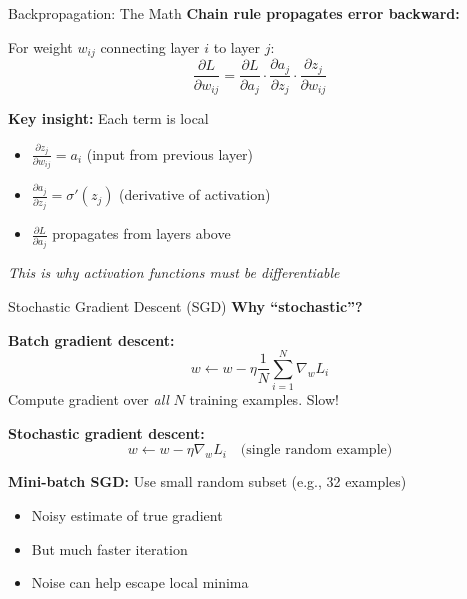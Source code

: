 \begin{frame}{Backpropagation: The Math}
    \textbf{Chain rule propagates error backward:}
    
    \vspace{1em}
    For weight $w_{ij}$ connecting layer $i$ to layer $j$:
    $$\frac{\partial L}{\partial w_{ij}} = \frac{\partial L}{\partial a_j} \cdot \frac{\partial a_j}{\partial z_j} \cdot \frac{\partial z_j}{\partial w_{ij}}$$
    
    \vspace{1em}
    \textbf{Key insight:} Each term is local
    \begin{itemize}
        \item $\frac{\partial z_j}{\partial w_{ij}} = a_i$ (input from previous layer)
        \item $\frac{\partial a_j}{\partial z_j} = \sigma'(z_j)$ (derivative of activation)
        \item $\frac{\partial L}{\partial a_j}$ propagates from layers above
    \end{itemize}
    
    \vspace{0.5em}
    \textit{This is why activation functions must be differentiable}
\end{frame}

\begin{frame}{Stochastic Gradient Descent (SGD)}
    \textbf{Why ``stochastic''?}
    
    \vspace{1em}
    \textbf{Batch gradient descent:}
    $$w \leftarrow w - \eta \frac{1}{N} \sum_{i=1}^{N} \nabla_w L_i$$
    Compute gradient over \textit{all} $N$ training examples. Slow!
    
    \vspace{1em}
    \textbf{Stochastic gradient descent:}
    $$w \leftarrow w - \eta \nabla_w L_i \quad \text{(single random example)}$$
    
    \vspace{0.5em}
    \textbf{Mini-batch SGD:} Use small random subset (e.g., 32 examples)
    \begin{itemize}
        \item Noisy estimate of true gradient
        \item But much faster iteration
        \item Noise can help escape local minima
    \end{itemize}
\end{frame}

